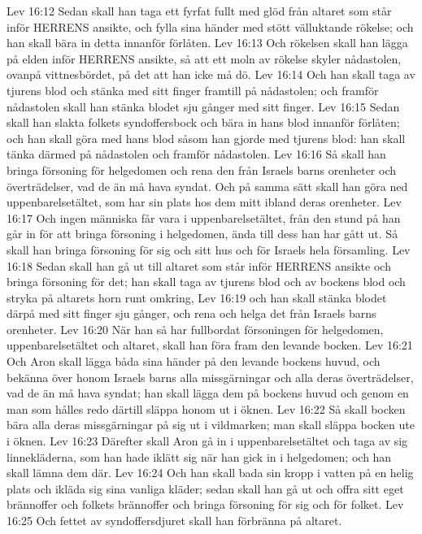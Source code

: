 Lev 16:12  Sedan skall han taga ett fyrfat fullt med glöd från altaret som står inför HERRENS ansikte, och fylla sina händer med stött välluktande rökelse; och han skall bära in detta innanför förlåten.
Lev 16:13  Och rökelsen skall han lägga på elden inför HERRENS ansikte, så att ett moln av rökelse skyler nådastolen, ovanpå vittnesbördet, på det att han icke må dö.
Lev 16:14  Och han skall taga av tjurens blod och stänka med sitt finger framtill på nådastolen; och framför nådastolen skall han stänka blodet sju gånger med sitt finger.
Lev 16:15  Sedan skall han slakta folkets syndoffersbock och bära in hans blod innanför förlåten; och han skall göra med hans blod såsom han gjorde med tjurens blod: han skall tänka därmed på nådastolen och framför nådastolen.
Lev 16:16  Så skall han bringa försoning för helgedomen och rena den från Israels barns orenheter och överträdelser, vad de än må hava syndat. Och på samma sätt skall han göra ned uppenbarelsetältet, som har sin plats hos dem mitt ibland deras orenheter.
Lev 16:17  Och ingen människa får vara i uppenbarelsetältet, från den stund på han går in för att bringa försoning i helgedomen, ända till dess han har gått ut. Så skall han bringa försoning för sig och sitt hus och för Israels hela församling.
Lev 16:18  Sedan skall han gå ut till altaret som står inför HERRENS ansikte och bringa försoning för det; han skall taga av tjurens blod och av bockens blod och stryka på altarets horn runt omkring,
Lev 16:19  och han skall stänka blodet därpå med sitt finger sju gånger, och rena och helga det från Israels barns orenheter.
Lev 16:20  När han så har fullbordat försoningen för helgedomen, uppenbarelsetältet och altaret, skall han föra fram den levande bocken.
Lev 16:21  Och Aron skall lägga båda sina händer på den levande bockens huvud, och bekänna över honom Israels barns alla missgärningar och alla deras överträdelser, vad de än må hava syndat; han skall lägga dem på bockens huvud och genom en man som hålles redo därtill släppa honom ut i öknen.
Lev 16:22  Så skall bocken bära alla deras missgärningar på sig ut i vildmarken; man skall släppa bocken ute i öknen.
Lev 16:23  Därefter skall Aron gå in i uppenbarelsetältet och taga av sig linnekläderna, som han hade iklätt sig när han gick in i helgedomen; och han skall lämna dem där.
Lev 16:24  Och han skall bada sin kropp i vatten på en helig plats och ikläda sig sina vanliga kläder; sedan skall han gå ut och offra sitt eget brännoffer och folkets brännoffer och bringa försoning för sig och för folket.
Lev 16:25  Och fettet av syndoffersdjuret skall han förbränna på altaret.
